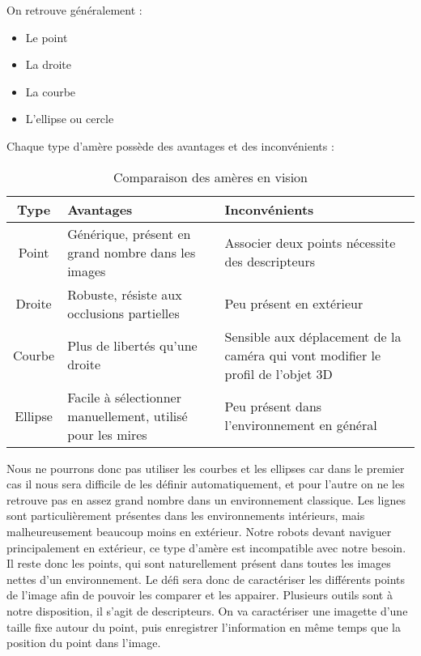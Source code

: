 On retrouve généralement :
\begin{itemize}
\item Le point
\item La droite
\item La courbe
\item L'ellipse ou cercle
\end{itemize}
Chaque type d'amère possède des avantages et des inconvénients :
\begin{table}[h]
  \begin{center}
    \begin{tabularx}{0.9\linewidth}{|c|X|X|}
      \hline
      \bf Type & \bf Avantages & \bf Inconvénients \\
      \hline
      Point & Générique, présent en grand nombre dans les images & Associer deux points nécessite des descripteurs\\
      \hline
      Droite & Robuste, résiste aux occlusions partielles & Peu présent en extérieur\\
      \hline
      Courbe & Plus de libertés qu'une droite & Sensible aux déplacement de la caméra qui vont modifier le profil de l'objet 3D\\
      \hline
      Ellipse & Facile à sélectionner manuellement, utilisé pour les mires & Peu présent dans l'environnement en général\\
      \hline
    \end{tabularx}    		
  \end{center}
  \caption{Comparaison des amères en vision}
\end{table}

Nous ne pourrons donc pas utiliser les courbes et les ellipses car dans le premier cas il nous sera difficile de les définir automatiquement, et pour l'autre on ne les retrouve pas en assez grand nombre dans un environnement classique.
Les lignes sont particulièrement présentes dans les environnements intérieurs, mais malheureusement beaucoup moins en extérieur.
Notre robots devant naviguer principalement en extérieur, ce type d'amère est incompatible avec notre besoin.
Il reste donc les points, qui sont naturellement présent dans toutes les images nettes d'un environnement.
Le défi sera donc de caractériser les différents points de l'image afin de pouvoir les comparer et les appairer.
Plusieurs outils sont à notre disposition, il s'agit de descripteurs.
On va caractériser une imagette d'une taille fixe autour du point, puis enregistrer l'information en même temps que la position du point dans l'image.

